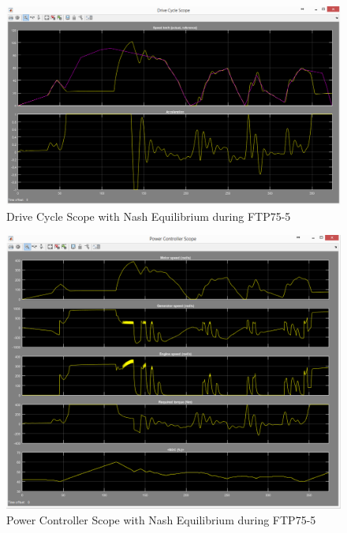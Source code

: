 \begin{figure}[h]
\centering
\includegraphics[scale=0.4]{figures/NashEquilibrium/FTP75-5/driveCycle16Juni}
\caption{Drive Cycle Scope with Nash Equilibrium during FTP75-5}
\label{fig:dcne5}
\end{figure}

\begin{figure}[h]
\centering
\includegraphics[scale=0.4]{figures/NashEquilibrium/FTP75-5/powerController16Juni}
\caption{Power Controller Scope with Nash Equilibrium during FTP75-5}
\label{fig:pcne5}
\end{figure}

